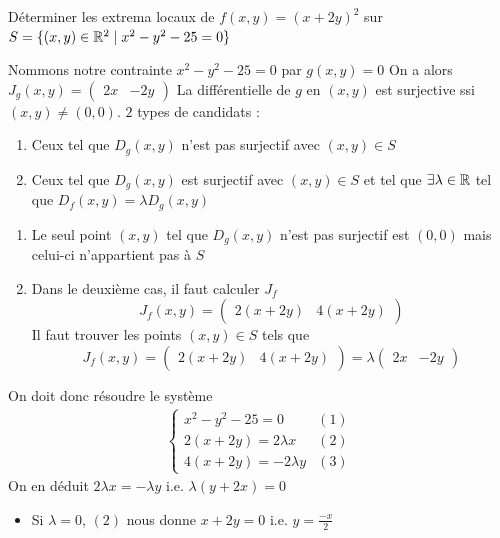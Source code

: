 \begin{exemple}
    Déterminer les extrema locaux de $f(x,y) = (x+2y)^2$ sur $S = \{(x,y)\in\mathbb{R}^2 \mid x^2 - y^2 - 25 = 0\}$
\end{exemple}
\begin{resolution}
    Nommons notre contrainte $x^2 - y^2 - 25 = 0$  par $g(x,y) = 0$
    On a alors $J_g(x,y) = \begin{pmatrix}
        2x & -2y
    \end{pmatrix}$ 
    La différentielle de $g$ en $(x,y)$ est surjective ssi $(x,y) \ne (0,0)$.
    $2$ types de candidats :
    \begin{enumerate}
        \item Ceux tel que $D_g(x,y)$ n'est pas surjectif avec $(x,y) \in S$
        \item Ceux tel que $D_g(x,y)$ est surjectif avec $(x,y) \in S$
        et tel que $\exists\lambda \in \mathbb{R}$ tel que $D_f(x,y) = \lambda D_g(x,y)$
    \end{enumerate}
    \begin{enumerate}
        \item Le seul point $(x,y)$ tel que $D_g(x,y)$ n'est pas surjectif est $(0,0)$ mais celui-ci n'appartient pas à $S$
        \item Dans le deuxième cas, il faut calculer $J_f$ $$J_f(x,y) = \begin{pmatrix}
            2(x+2y) & 4(x+2y)
        \end{pmatrix}$$
        Il faut trouver les points $(x,y)\in S$ tels que $$J_f(x,y) = \begin{pmatrix}
            2(x+2y) & 4(x+2y)
        \end{pmatrix} = \lambda\begin{pmatrix}
            2x & -2y
        \end{pmatrix}$$
    \end{enumerate}
    On doit donc résoudre le système
    \begin{align*}
        \begin{cases}
            x^2-y^2-25 = 0 & (1)\\
            2(x+2y) = 2\lambda x & (2) \\
            4(x+2y) = -2\lambda y & (3)
        \end{cases}
    \end{align*}
    On en déduit $2\lambda x = -\lambda y$ i.e. $\lambda(y+2x) = 0$
    \begin{itemize}
    \item Si $\lambda = 0$, $(2)$ nous donne $x + 2y = 0$ i.e. $y = \frac{-x}{2}$

\end{itemize}
\end{resolution}

